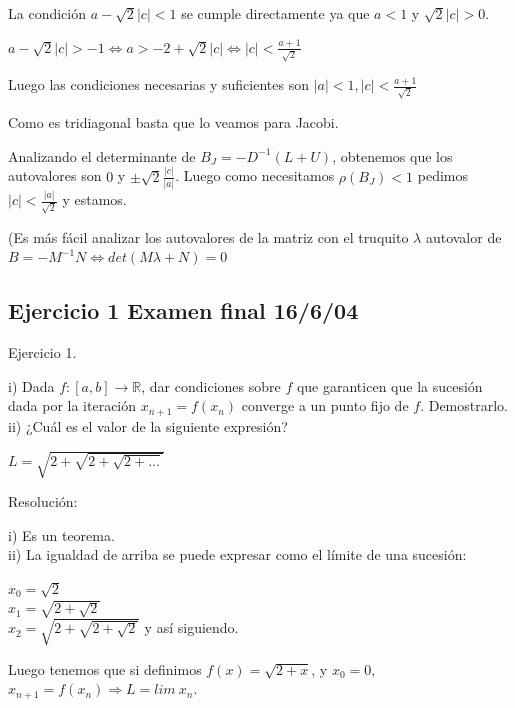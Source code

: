 \documentclass[10pt,a4paper,final]{report}
\def\R{\mathbb{R}}
\begin{document}
{%


La condición $a-\sqrt{2} |c| < 1$ se cumple directamente ya que $a<1$ y $\sqrt{2} |c|>0$.

$a - \sqrt{2}|c| > -1 \Leftrightarrow a > -2 + \sqrt{2} |c| \Leftrightarrow |c| < \frac{a+1}{\sqrt{2}}$

Luego las condiciones necesarias y suficientes son $|a|<1, |c| < \frac{a+1}{\sqrt{2}}$

\fi


Como es tridiagonal basta que lo veamos para Jacobi.

Analizando el determinante de $B_J = - D^{-1} (L+U)$, obtenemos que los autovalores son $0$ y $\pm \sqrt{2} \frac{|c|}{|a|}$. Luego como necesitamos $\rho(B_J) < 1$ pedimos $|c|<\frac{|a|}{\sqrt{2}}$ y estamos.

(Es más fácil analizar los autovalores de la matriz con el truquito $\lambda$ autovalor de $B = -M^{-1} N \Leftrightarrow det(M\lambda + N) = 0$

\subsection{Ejercicio 1 Examen final 16/6/04}
Ejercicio 1.

i) Dada $f:[a,b] \rightarrow \mathbb{R}$, dar condiciones sobre $f$ que garanticen que la sucesión dada por la iteración $x_{n+1} = f(x_n)$ converge a un punto fijo de $f$. Demostrarlo.\\

ii) ¿Cuál es el valor de la siguiente expresión?

$L = \sqrt{2 + \sqrt{2 + \sqrt{2+...}}}$


Resolución:

i) Es un teorema. \\

ii) La igualdad de arriba se puede expresar como el límite de una sucesión:

$x_0 = \sqrt{2}$\\
$x_1 = \sqrt{2 + \sqrt{2}}$\\
$x_2 = \sqrt{2 + \sqrt{2 + \sqrt{2}}}$
y así siguiendo.

Luego tenemos que si definimos $f(x) = \sqrt{2 + x}$, y $x_0 = 0$, $x_{n+1} = f(x_n) \Rightarrow L = lim\ x_n$.

}
\end{document}
